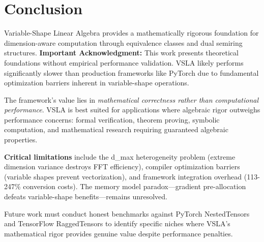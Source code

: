 \section{Conclusion}
Variable-Shape Linear Algebra provides a mathematically rigorous foundation for dimension-aware computation through equivalence classes and dual semiring structures. \textbf{Important Acknowledgment:} This work presents theoretical foundations without empirical performance validation. VSLA likely performs significantly slower than production frameworks like PyTorch due to fundamental optimization barriers inherent in variable-shape operations. 

The framework's value lies in \textit{mathematical correctness rather than computational performance}. VSLA is best suited for applications where algebraic rigor outweighs performance concerns: formal verification, theorem proving, symbolic computation, and mathematical research requiring guaranteed algebraic properties. 

\textbf{Critical limitations} include the d\_max heterogeneity problem (extreme dimension variance destroys FFT efficiency), compiler optimization barriers (variable shapes prevent vectorization), and framework integration overhead (113-247\% conversion costs). The memory model paradox—gradient pre-allocation defeats variable-shape benefits—remains unresolved.

Future work must conduct honest benchmarks against PyTorch NestedTensors and TensorFlow RaggedTensors to identify specific niches where VSLA's mathematical rigor provides genuine value despite performance penalties.

